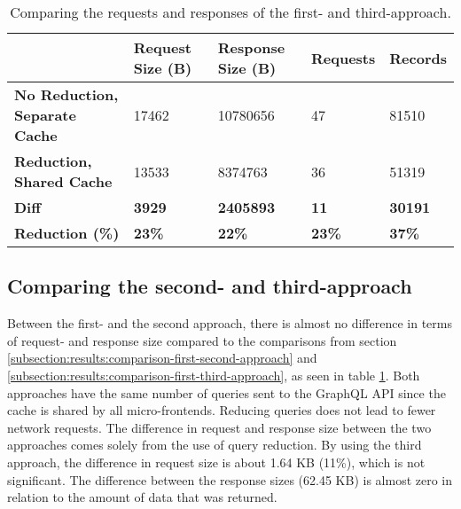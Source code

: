 \ifshowTables
\begin{table}[H]
  \begin{tabular}{|l|l|l|l|l|}
  \hline
  & \textbf{Request Size (B)} & \textbf{Response Size (B)} & \textbf{Requests} & \textbf{Records}  \\
  \hline
  \textbf{No Reduction, Separate Cache} & 17462 & 10780656 & 47 & 81510 \\
  \hline
  \textbf{Reduction, Shared Cache} & 13533 & 8374763 & 36 & 51319 \\
  \hline
  \hline
  \textbf{Diff} & \textbf{3929} & \textbf{2405893} & \textbf{11} & \textbf{30191} \\
  \hline
  \textbf{Reduction (\%)} & \textbf{23\%} & \textbf{22\%} & \textbf{23\%} & \textbf{37\%} \\
  \hline
  \end{tabular}
  \caption{Comparing the requests and responses of the first- and third-approach.}\label{table:results:size-comparison-first-path-no-cache-no-reduction-cache-reduction}
\end{table}
\fi

\subsection{Comparing the second- and third-approach}

Between the first- and the second approach, there is almost no difference in terms of request- and response size compared to the comparisons from section \ref{subsection:results:comparison-first-second-approach} and \ref{subsection:results:comparison-first-third-approach}, as seen in table \ref{table:results:size-comparison-first-path-no-cache-no-reduction-cache-reduction}. Both approaches have the same number of queries sent to the GraphQL \ac{API} since the cache is shared by all micro-frontends. Reducing queries does not lead to fewer network requests. The difference in request and response size between the two approaches comes solely from the use of query reduction. By using the third approach, the difference in request size is about 1.64 KB (11\%), which is not significant. The difference between the response sizes (62.45 KB) is almost zero in relation to the amount of data that was returned.

